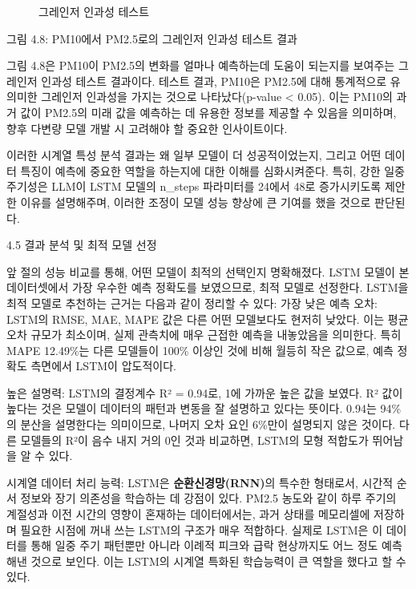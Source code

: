 \documentclass[12pt,ko,a4,]{report}
\begin{document}
\begin{figure}
\centering
{}
\caption{그레인저 인과성 테스트}
\end{figure}

그림 4.8: PM10에서 PM2.5로의 그레인저 인과성 테스트 결과

그림 4.8은 PM10이 PM2.5의 변화를 얼마나 예측하는데 도움이 되는지를
보여주는 그레인저 인과성 테스트 결과이다. 테스트 결과, PM10은 PM2.5에
대해 통계적으로 유의미한 그레인저 인과성을 가지는 것으로
나타났다(p-value \textless{} 0.05). 이는 PM10의 과거 값이 PM2.5의 미래
값을 예측하는 데 유용한 정보를 제공할 수 있음을 의미하며, 향후 다변량
모델 개발 시 고려해야 할 중요한 인사이트이다.

이러한 시계열 특성 분석 결과는 왜 일부 모델이 더 성공적이었는지, 그리고
어떤 데이터 특징이 예측에 중요한 역할을 하는지에 대한 이해를
심화시켜준다. 특히, 강한 일중 주기성은 LLM이 LSTM 모델의 n\_steps
파라미터를 24에서 48로 증가시키도록 제안한 이유를 설명해주며, 이러한
조정이 모델 성능 향상에 큰 기여를 했을 것으로 판단된다.

4.5 결과 분석 및 최적 모델 선정

앞 절의 성능 비교를 통해, 어떤 모델이 최적의 선택인지 명확해졌다. LSTM
모델이 본 데이터셋에서 가장 우수한 예측 정확도를 보였으므로, 최적 모델로
선정한다. LSTM을 최적 모델로 추천하는 근거는 다음과 같이 정리할 수 있다:
가장 낮은 예측 오차: LSTM의 RMSE, MAE, MAPE 값은 다른 어떤 모델보다도
현저히 낮았다. 이는 평균 오차 규모가 최소이며, 실제 관측치에 매우 근접한
예측을 내놓았음을 의미한다. 특히 MAPE 12.49\%는 다른 모델들이 100\%
이상인 것에 비해 월등히 작은 값으로, 예측 정확도 측면에서 LSTM이
압도적이다.

높은 설명력: LSTM의 결정계수 R² = 0.94로, 1에 가까운 높은 값을 보였다.
R² 값이 높다는 것은 모델이 데이터의 패턴과 변동을 잘 설명하고 있다는
뜻이다. 0.94는 94\%의 분산을 설명한다는 의미이므로, 나머지 오차 요인
6\%만이 설명되지 않은 것이다. 다른 모델들의 R²이 음수 내지 거의 0인 것과
비교하면, LSTM의 모형 적합도가 뛰어남을 알 수 있다.

시계열 데이터 처리 능력: LSTM은 \textbf{순환신경망(RNN)}의 특수한
형태로서, 시간적 순서 정보와 장기 의존성을 학습하는 데 강점이 있다.
PM2.5 농도와 같이 하루 주기의 계절성과 이전 시간의 영향이 혼재하는
데이터에서는, 과거 상태를 메모리셀에 저장하며 필요한 시점에 꺼내 쓰는
LSTM의 구조가 매우 적합하다. 실제로 LSTM은 이 데이터를 통해 일중 주기
패턴뿐만 아니라 이례적 피크와 급락 현상까지도 어느 정도 예측해낸 것으로
보인다. 이는 LSTM의 시계열 특화된 학습능력이 큰 역할을 했다고 할 수
있다.
\end{document}
